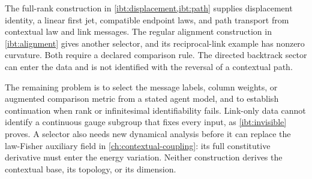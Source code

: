 The full-rank construction in \cref{ibt:displacement,ibt:path} supplies displacement identity, a linear first jet, compatible endpoint laws, and path transport from contextual law and link messages. The regular alignment construction in \cref{ibt:alignment} gives another selector, and its reciprocal-link example has nonzero curvature. Both require a declared comparison rule. The directed backtrack sector can enter the data and is not identified with the reversal of a contextual path.

The remaining problem is to select the message labels, column weights, or augmented comparison metric from a stated agent model, and to establish continuation when rank or infinitesimal identifiability fails. Link-only data cannot identify a continuous gauge subgroup that fixes every input, as \cref{ibt:invisible} proves. A selector also needs new dynamical analysis before it can replace the law-Fisher auxiliary field in \cref{ch:contextual-coupling}: its full constitutive derivative must enter the energy variation. Neither construction derives the contextual base, its topology, or its dimension.
